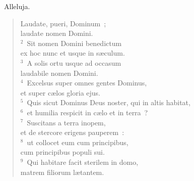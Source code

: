 ~\lettrine[lines=10,image=true,loversize=0.05,lraise=-0.03]{A}{}lleluja. \begin{flushleft}\begin{verse}\vspace{6pt}Laudate, pueri, Dominum~;\\ laudate nomen Domini.\\
${}^{2}$~Sit nomen Domini benedictum\\ ex hoc nunc et usque in s\ae culum.\\
${}^{3}$~A solis ortu usque ad occasum\\ laudabile nomen Domini.\\
${}^{4}$~Excelsus super omnes gentes Dominus,\\ et super c\ae los gloria ejus.\\
${}^{5}$~Quis sicut Dominus Deus noster, qui in altis habitat,\\
${}^{6}$~et humilia respicit in c\ae lo et in terra~?\\
${}^{7}$~Suscitans a terra inopem,\\ et de stercore erigens pauperem~:\\
${}^{8}$~ut collocet eum cum principibus,\\ cum principibus populi sui.\\
${}^{9}$~Qui habitare facit sterilem in domo,\\ matrem filiorum l\ae tantem.\end{verse}\end{flushleft}


